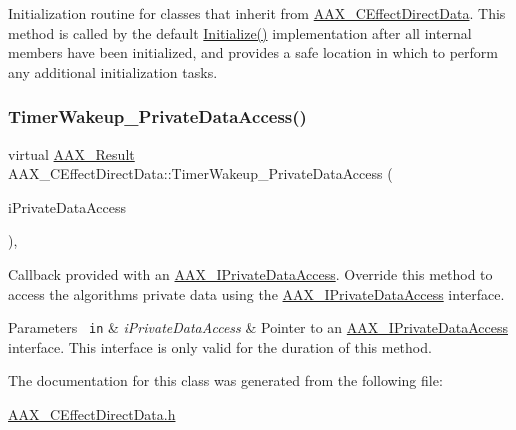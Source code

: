 Initialization routine for classes that inherit from \mbox{\hyperlink{a01473}{A\+A\+X\+\_\+\+C\+Effect\+Direct\+Data}}. This method is called by the default \mbox{\hyperlink{a01473_ad89ee93781539d8df3b0710a186c7e0d}{Initialize()}} implementation after all internal members have been initialized, and provides a safe location in which to perform any additional initialization tasks. 

\mbox{\label{a01473_addd263d3a410d5c26148cee306cc7297}} 
\subsubsection{\texorpdfstring{TimerWakeup\_PrivateDataAccess()}{TimerWakeup\_PrivateDataAccess()}}
{\footnotesize\ttfamily virtual \mbox{\hyperlink{a00392_a4d8f69a697df7f70c3a8e9b8ee130d2f}{A\+A\+X\+\_\+\+Result}} A\+A\+X\+\_\+\+C\+Effect\+Direct\+Data\+::\+Timer\+Wakeup\+\_\+\+Private\+Data\+Access (\begin{DoxyParamCaption}\item[{\mbox{\hyperlink{a01865}{A\+A\+X\+\_\+\+I\+Private\+Data\+Access}} $\ast$}]{i\+Private\+Data\+Access }\end{DoxyParamCaption})\hspace{0.3cm}{\ttfamily [protected]}, {\ttfamily [virtual]}}



Callback provided with an \mbox{\hyperlink{a01865}{A\+A\+X\+\_\+\+I\+Private\+Data\+Access}}. Override this method to access the algorithm\textquotesingle{}s private data using the \mbox{\hyperlink{a01865}{A\+A\+X\+\_\+\+I\+Private\+Data\+Access}} interface. 


\begin{DoxyParams}[1]{Parameters}
\mbox{\texttt{ in}}  & {\em i\+Private\+Data\+Access} & Pointer to an \mbox{\hyperlink{a01865}{A\+A\+X\+\_\+\+I\+Private\+Data\+Access}} interface. This interface is only valid for the duration of this method. \\
\hline
\end{DoxyParams}


The documentation for this class was generated from the following file\+:\begin{DoxyCompactItemize}
\item 
\mbox{\hyperlink{a00422}{A\+A\+X\+\_\+\+C\+Effect\+Direct\+Data.\+h}}\end{DoxyCompactItemize}
